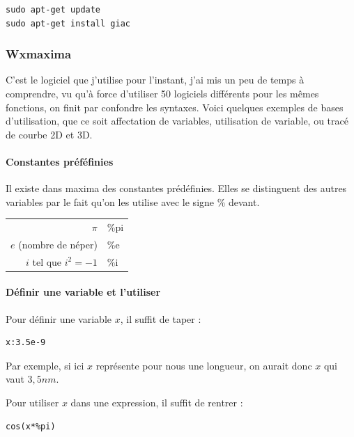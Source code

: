 \documentclass[a4paper,twoside]{article}
\begin{document}
\begin{verbatim}
sudo apt-get update
sudo apt-get install giac
\end{verbatim}


\subsubsection{Wxmaxima}
C'est le logiciel que j'utilise pour l'instant, j'ai mis un peu de temps à comprendre, vu qu'à force d'utiliser 50 logiciels différents pour les mêmes fonctions, on finit par confondre les syntaxes. Voici quelques exemples de bases d'utilisation, que ce soit affectation de variables, utilisation de variable, ou tracé de courbe 2D et 3D.

\paragraph{Constantes préféfinies}\label{maxima:constantes}
Il existe dans maxima des constantes prédéfinies. Elles se distinguent des autres variables par le fait qu'on les utilise avec le signe \og \% \fg devant.



\begin{tabular}{rl}
$\pi$&\%pi\\
$e$ (nombre de néper)&\%e\\
$i$ tel que $i^2=-1$&\%i
\end{tabular}

\paragraph{Définir une variable et l'utiliser}

Pour définir une variable $x$, il suffit de taper :

\begin{verbatim}
x:3.5e-9
\end{verbatim}

\begin{remarque}
Par exemple, si ici $x$ représente pour nous une longueur, on aurait donc $x$ qui vaut $3,5\unit{nm}$.
\end{remarque}

Pour utiliser $x$ dans une expression, il suffit de rentrer :

\begin{verbatim}
cos(x*%pi)
\end{verbatim}
\end{document}
